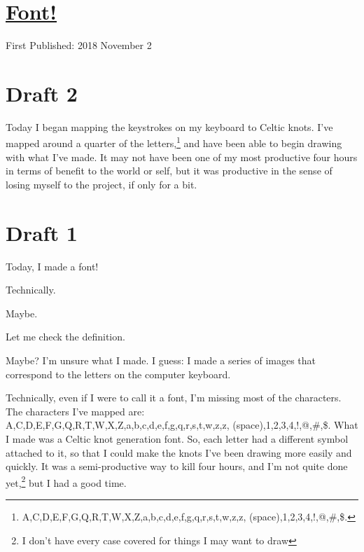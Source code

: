 \documentclass[12pt]{article}[titlepage]
\newcommand{\1}{\={a}}
\newcommand{\2}{\={e}}
\newcommand{\3}{\={\i}}
\newcommand{\4}{\=o}
\newcommand{\5}{\=u}
\newcommand{\6}{\={A}}
\renewcommand{\,}{\textsuperscript{,}}
\begin{document}
\doublespacing
\section{\href{font.html}{Font!}}
First Published: 2018 November 2
\section{Draft 2}
Today I began mapping the keystrokes on my keyboard to Celtic knots.
I've mapped around a quarter of the letters,\footnote{A,C,D,E,F,G,Q,R,T,W,X,Z,a,b,c,d,e,f,g,q,r,s,t,w,z,z, (space),1,2,3,4,!,@,#,\$.} and have been able to begin drawing with what I've made.
It may not have been one of my most productive four hours in terms of benefit to the world or self, but it was productive in the sense of losing myself to the project, if only for a bit.
\section{Draft 1}
Today, I made a font!

Technically.

Maybe.

Let me check the definition.

Maybe?
I'm unsure what I made.
I guess: I made a series of images that correspond to the letters on the computer keyboard.

Technically, even if I were to call it a font, I'm missing most of the characters.
The characters I've mapped are: A,C,D,E,F,G,Q,R,T,W,X,Z,a,b,c,d,e,f,g,q,r,s,t,w,z,z, (space),1,2,3,4,!,@,#,\$.
What I made was a Celtic knot generation font.
So, each letter had a different symbol attached to it, so that I could make the knots I've been drawing more easily and quickly.
It was a semi-productive way to kill four hours, and I'm not quite done yet,\footnote{I don't have every case covered for things I may want to draw} but I had a good time.
\end{document}
